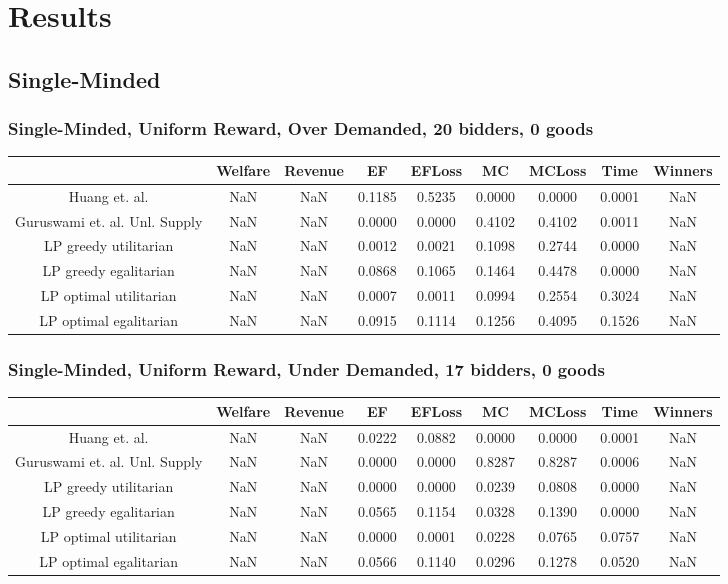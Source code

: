 \section{Results}
\subsection{Single-Minded}
\subsubsection*{Single-Minded, Uniform Reward, Over Demanded, 20 bidders, 0 goods} 
\begin{tabular}{|c|c|c|c|c|c|c|c|c|}\hline
                            	&Welfare	&Revenue	&EF	&EFLoss	&MC	&MCLoss	&Time	&Winners	\\\hline
                 Huang et. al.	&NaN	&NaN	&0.1185	&0.5235	&0.0000	&0.0000	&0.0001	&NaN	\\\hline 
 Guruswami et. al. Unl. Supply	&NaN	&NaN	&0.0000	&0.0000	&0.4102	&0.4102	&0.0011	&NaN	\\\hline 
         LP greedy utilitarian	&NaN	&NaN	&0.0012	&0.0021	&0.1098	&0.2744	&0.0000	&NaN	\\\hline 
         LP greedy egalitarian	&NaN	&NaN	&0.0868	&0.1065	&0.1464	&0.4478	&0.0000	&NaN	\\\hline 
        LP optimal utilitarian	&NaN	&NaN	&0.0007	&0.0011	&0.0994	&0.2554	&0.3024	&NaN	\\\hline 
        LP optimal egalitarian	&NaN	&NaN	&0.0915	&0.1114	&0.1256	&0.4095	&0.1526	&NaN	\\\hline 
\end{tabular}\subsubsection*{Single-Minded, Uniform Reward, Under Demanded, 17 bidders, 0 goods} 
\begin{tabular}{|c|c|c|c|c|c|c|c|c|}\hline
                            	&Welfare	&Revenue	&EF	&EFLoss	&MC	&MCLoss	&Time	&Winners	\\\hline
                 Huang et. al.	&NaN	&NaN	&0.0222	&0.0882	&0.0000	&0.0000	&0.0001	&NaN	\\\hline 
 Guruswami et. al. Unl. Supply	&NaN	&NaN	&0.0000	&0.0000	&0.8287	&0.8287	&0.0006	&NaN	\\\hline 
         LP greedy utilitarian	&NaN	&NaN	&0.0000	&0.0000	&0.0239	&0.0808	&0.0000	&NaN	\\\hline 
         LP greedy egalitarian	&NaN	&NaN	&0.0565	&0.1154	&0.0328	&0.1390	&0.0000	&NaN	\\\hline 
        LP optimal utilitarian	&NaN	&NaN	&0.0000	&0.0001	&0.0228	&0.0765	&0.0757	&NaN	\\\hline 
        LP optimal egalitarian	&NaN	&NaN	&0.0566	&0.1140	&0.0296	&0.1278	&0.0520	&NaN	\\\hline 
\end{tabular}\newpage

